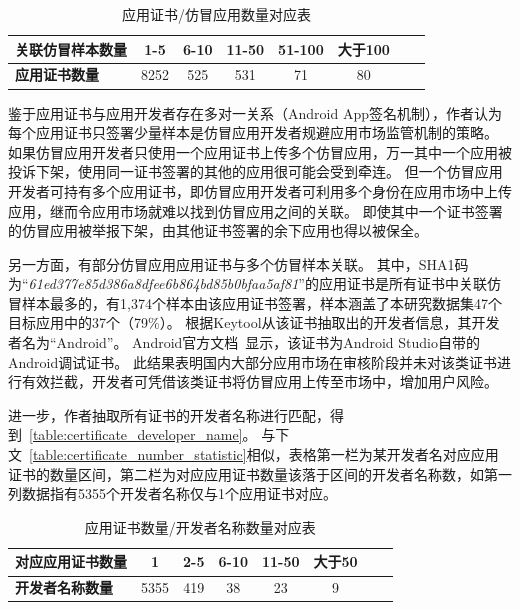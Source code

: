 \begin{table}[htbp]
    \renewcommand{\arraystretch}{1}
    \footnotesize
    \centering
    \caption{应用证书/仿冒应用数量对应表}
    \vspace{1mm}
    \begin{tabular}{l c c c c c c c}
        \toprule
        {\bf 关联仿冒样本数量} & {\bf 1-5} & {\bf 6-10} & {\bf 11-50} & {\bf 51-100} & {\bf 大于100} \\
        \midrule
        {\bf 应用证书数量}     & 8252      & 525        & 531         & 71           & 80            \\
        \bottomrule
    \end{tabular}
    \label{table:certificate_number_statistic}
\end{table}

鉴于应用证书与应用开发者存在多对一关系（Android App签名机制），作者认为每个应用证书只签署少量样本是仿冒应用开发者规避应用市场监管机制的策略。
如果仿冒应用开发者只使用一个应用证书上传多个仿冒应用，万一其中一个应用被投诉下架，使用同一证书签署的其他的应用很可能会受到牵连。
但一个仿冒应用开发者可持有多个应用证书，即仿冒应用开发者可利用多个身份在应用市场中上传应用，继而令应用市场就难以找到仿冒应用之间的关联。
即使其中一个证书签署的仿冒应用被举报下架，由其他证书签署的余下应用也得以被保全。

另一方面，有部分仿冒应用应用证书与多个仿冒样本关联。
其中，SHA1码为``\emph{61ed377e85d386a8dfee6b864bd85b0bfaa5af81}''的应用证书是所有证书中关联仿冒样本最多的，有1,374个样本由该应用证书签署，样本涵盖了本研究数据集47个目标应用中的37个（79\%）。
根据Keytool从该证书抽取出的开发者信息，其开发者名为``Android''。
Android官方文档~\cite{UICCcert}显示，该证书为Android Studio自带的Android调试证书。
此结果表明国内大部分应用市场在审核阶段并未对该类证书进行有效拦截，开发者可凭借该类证书将仿冒应用上传至市场中，增加用户风险。

进一步，作者抽取所有证书的开发者名称进行匹配，得到~\autoref{table:certificate_developer_name}。
与下文~\autoref{table:certificate_number_statistic}相似，表格第一栏为某开发者名对应应用证书的数量区间，第二栏为对应应用证书数量该落于区间的开发者名称数，如第一列数据指有5355个开发者名称仅与1个应用证书对应。

\begin{table}[htbp]
    \renewcommand{\arraystretch}{1}
    \footnotesize
    \centering
    \caption{应用证书数量/开发者名称数量对应表}
    \vspace{1mm}
    \begin{tabular}{l c c c c c c c}
        \toprule
        {\bf 对应应用证书数量} & {\bf 1} & {\bf 2-5} & {\bf 6-10} & {\bf 11-50} & {\bf 大于50} \\
        \midrule
        {\bf 开发者名称数量}   & 5355    & 419       & 38         & 23          & 9            \\
        \bottomrule
    \end{tabular}
    \label{table:certificate_developer_name}
\end{table}

